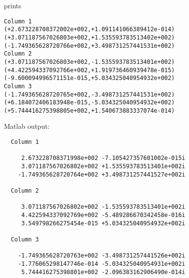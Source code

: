 prints
\begin{Verbatim}
Column 1
(+2.673228708372002e+002,+1.091141066389412e-014)
(+3.071187567026803e+002,+1.535593783513402e+002)
(-1.749365628720766e+002,+3.498731257441531e+002)
Column 2
(+3.071187567026803e+002,-1.535593783513401e+002)
(+4.422594337092766e+002,+1.919736460939478e-015)
(-9.600094996571151e-015,+5.034325040954932e+002)
Column 3
(-1.749365628720765e+002,-3.498731257441531e+002)
(+6.184072406183948e-015,-5.034325040954932e+002)
(+5.744416275398805e+002,+1.540673883337074e-014)
\end{Verbatim}
Matlab output:
\begin{Verbatim}
  Column 1 

     2.673228708371998e+002 -7.105427357601002e-015i
     3.071187567026802e+002 +1.535593783513401e+002i
    -1.749365628720764e+002 +3.498731257441527e+002i

  Column 2 

     3.071187567026802e+002 -1.535593783513401e+002i
     4.422594337092769e+002 -5.489286670342458e-016i
     3.549798266275454e-015 +5.034325040954932e+002i

  Column 3 

    -1.749365628720763e+002 -3.498731257441526e+002i
    -1.776065298147746e-014 -5.034325040954931e+002i
     5.744416275398801e+002 -2.096383162906490e-014i
\end{Verbatim}
\newpage




